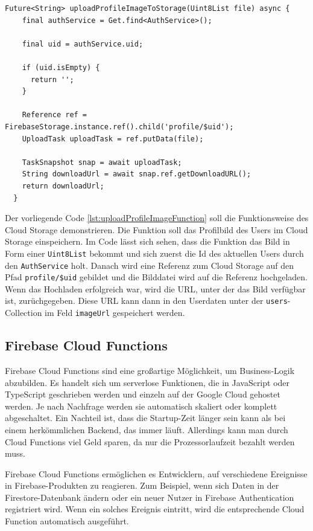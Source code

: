 \begin{lstlisting}[caption=uploadProfileImageToStorage Funktion,label=lst:uploadProfileImageFunction]
  Future<String> uploadProfileImageToStorage(Uint8List file) async {
    final authService = Get.find<AuthService>();

    final uid = authService.uid;

    if (uid.isEmpty) {
      return '';
    }

    Reference ref = FirebaseStorage.instance.ref().child('profile/$uid');
    UploadTask uploadTask = ref.putData(file);

    TaskSnapshot snap = await uploadTask;
    String downloadUrl = await snap.ref.getDownloadURL();
    return downloadUrl;
  }

\end{lstlisting}
Der vorliegende Code \ref{lst:uploadProfileImageFunction} soll die Funktionsweise des Cloud Storage demonstrieren. Die Funktion soll das Profilbild des Users im Cloud Storage einspeichern. Im Code lässt sich sehen, dass die Funktion das Bild in Form einer \texttt{Uint8List} bekommt und sich zuerst die Id des aktuellen Users durch den \texttt{AuthService} holt. Danach wird eine Referenz zum Cloud Storage auf den Pfad \texttt{profile/\$uid} gebildet und die Bilddatei wird auf die Referenz hochgeladen. Wenn das Hochladen erfolgreich war, wird die URL, unter der das Bild verfügbar ist, zurüchgegeben. Diese URL kann dann in den Userdaten unter der \texttt{users}-Collection im Feld \texttt{imageUrl} gespeichert werden.

\subsection{Firebase Cloud Functions}
Firebase Cloud Functions sind eine großartige Möglichkeit,
um Business-Logik abzubilden. Es handelt sich um serverlose
Funktionen, die in JavaScript oder TypeScript geschrieben
werden und einzeln auf der Google Cloud gehostet werden. Je
nach Nachfrage werden sie automatisch skaliert oder komplett
abgeschaltet. Ein Nachteil ist, dass die Startup-Zeit länger
sein kann als bei einem herkömmlichen Backend, das immer
läuft. Allerdings kann man durch Cloud Functions viel Geld
sparen, da nur die Prozessorlaufzeit bezahlt werden muss.

Firebase Cloud Functions ermöglichen es Entwicklern, auf verschiedene Ereignisse in Firebase-Produkten zu reagieren. Zum Beispiel, wenn sich Daten in der Firestore-Datenbank ändern oder ein neuer Nutzer in Firebase Authentication registriert wird. Wenn ein solches Ereignis eintritt, wird die entsprechende Cloud Function automatisch ausgeführt.

